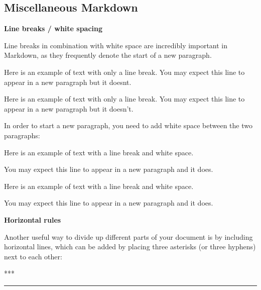 \documentclass[]{tufte-book}
\newenvironment{Shaded}{\begin{snugshade}}{\end{snugshade}}
\newcommand{\NormalTok}[1]{#1}
\begin{document}
\hypertarget{miscellaneous-markdown}{%
\subsection{Miscellaneous Markdown}\label{miscellaneous-markdown}}

\textbf{Line breaks / white spacing}

Line breaks in combination with white space are incredibly important in Markdown, as they frequently denote the start of a new paragraph.

\begin{Shaded}
\begin{Highlighting}[]
\NormalTok{Here is an example of text with only a line break.}
\NormalTok{You may expect this line to appear in a new paragraph but it doesn\textquotesingle{}t.}
\end{Highlighting}
\end{Shaded}

Here is an example of text with only a line break.
You may expect this line to appear in a new paragraph but it doesn't.

In order to start a new paragraph, you need to add white space between the two paragraphs:

\begin{Shaded}
\begin{Highlighting}[]
\NormalTok{Here is an example of text with a line break and white space.}

\NormalTok{You may expect this line to appear in a new paragraph and it does.}
\end{Highlighting}
\end{Shaded}

Here is an example of text with a line break and white space.

You may expect this line to appear in a new paragraph and it does.

\textbf{Horizontal rules}

Another useful way to divide up different parts of your document is by including horizontal lines, which can be added by placing three asterisks (or three hyphens) next to each other:

\begin{Shaded}
\begin{Highlighting}[]
\NormalTok{***}
\end{Highlighting}
\end{Shaded}

\begin{center}\rule{0.5\linewidth}{0.5pt}\end{center}
\end{document}
